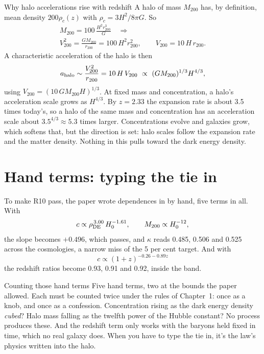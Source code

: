 \begin{mathbox}{Why halo accelerations rise with redshift}
A halo of mass $M_{200}$ has, by definition, mean density $200\rho_c(z)$ with $\rho_c=3H^2/8\pi G$. So
\begin{gather*}
M_{200}=100\,\frac{H^2r_{200}^3}{G}\quad\Longrightarrow\\
V_{200}^2=\frac{GM_{200}}{r_{200}}=100\,H^2r_{200}^2,\qquad V_{200}=10\,H\,r_{200}.
\end{gather*}
A characteristic acceleration of the halo is then
\[
a_{\rm halo}\sim\frac{V_{200}^2}{r_{200}}=10\,H\,V_{200}\ \propto\ (GM_{200})^{1/3}H^{4/3},
\]
using $V_{200}=(10\,GM_{200}H)^{1/3}$. At fixed mass and concentration, a halo's acceleration scale grows as $H^{4/3}$. By $z=2.33$ the expansion rate is about 3.5 times today's, so a halo of the same mass and concentration has an acceleration scale about $3.5^{4/3}\approx5.3$ times larger. Concentrations evolve and galaxies grow, which softens that, but the direction is set: halo scales follow the expansion rate and the matter density. Nothing in this pulls toward the dark energy density.
\end{mathbox}



\section{Hand terms: typing the tie in}

To make R10 pass, the paper wrote dependences in by hand, five terms in all. With
\begin{equation}
c\propto\rho_{\rm DE}^{\,3.00}\,H_0^{-1.61},\qquad M_{200}\propto H_0^{-12},
\end{equation}
the slope becomes $+0.496$, which passes, and $\kappa$ reads 0.485, 0.506 and 0.525 across the cosmologies, a narrow miss of the 5 per cent target. And with
\begin{equation}
c\propto(1+z)^{-0.26-0.89z}
\end{equation}
the redshift ratios become 0.93, 0.91 and 0.92, inside the band.

\begin{knobbox}{Counting those hand terms}
Five hand terms, two at the bounds the paper allowed. Each must be counted twice under the rules of Chapter~1: once as a knob, and once as a confession. Concentration rising as the dark energy density \emph{cubed}? Halo mass falling as the twelfth power of the Hubble constant? No process produces these. And the redshift term only works with the baryons held fixed in time, which no real galaxy does. When you have to type the tie in, it's the law's physics written into the halo.
\end{knobbox}


